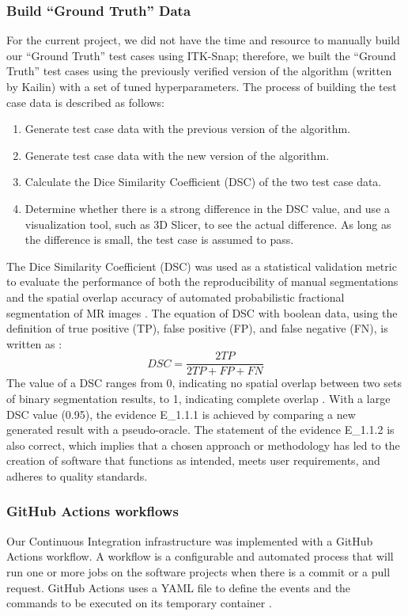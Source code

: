\subsubsection{Build ``Ground Truth'' Data}
For the current project, we did not have the time and resource to manually build our ``Ground Truth'' test cases using ITK-Snap; therefore, we built the ``Ground Truth'' test cases using the previously verified version of the algorithm (written by Kailin) with a set of tuned hyperparameters. The process of building the test case data is described as follows:

\begin{enumerate}
  \item Generate test case data with the previous version of the algorithm.
  \item Generate test case data with the new version of the algorithm.
  \item Calculate the Dice Similarity Coefficient (DSC) of the two test case data.
  \item Determine whether there is a strong difference in the DSC value, and use a visualization tool, such as 3D Slicer, to see the actual difference. As long as the difference is small, the test case is assumed to pass.
\end{enumerate}

The Dice Similarity Coefficient (DSC) was used as a statistical validation metric to evaluate the performance of both the reproducibility of manual segmentations and the spatial overlap accuracy of automated probabilistic fractional segmentation of MR images \cite{ZOU2004178}. The equation of DSC with boolean data, using the definition of true positive (TP), false positive (FP), and false negative (FN), is written as \cite{Wikipedia_2023}:
\begin{equation}
DSC = \frac{2TP}{2TP+FP+FN}
\end{equation}
The value of a DSC ranges from 0, indicating no spatial overlap between two sets of binary segmentation results, to 1, indicating complete overlap \cite{ZOU2004178}. With a large DSC value (0.95), the evidence E\_1.1.1 is achieved by comparing a new generated result with a pseudo-oracle. The statement of the evidence E\_1.1.2 is also correct, which implies that a chosen approach or methodology has led to the creation of software that functions as intended, meets user requirements, and adheres to quality standards.

\subsubsection{GitHub Actions workflows}\label{ci}
Our Continuous Integration infrastructure was implemented with a GitHub Actions workflow. A workflow is a configurable and automated process that will run one or more jobs on the software projects when there is a commit or a pull request. GitHub Actions uses a YAML file to define the events and the commands to be executed on its temporary container \cite{GitHubActions}.

